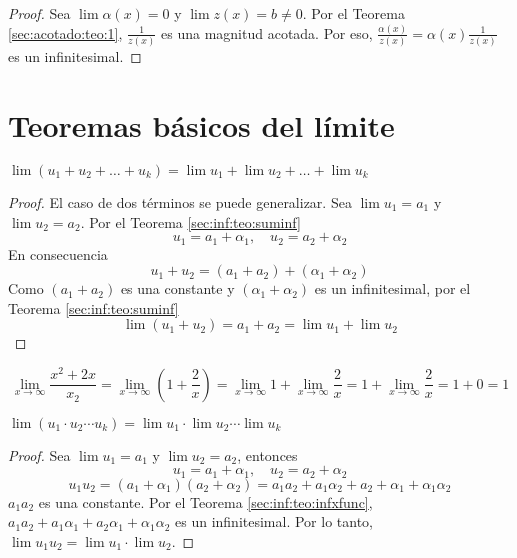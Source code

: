 \begin{proof}
  Sea $\lim \alpha(x) = 0$ y $\lim z(x) = b \ne 0$. Por el Teorema \ref{sec:acotado:teo:1}, $\frac {1} {z(x)}$ es una magnitud acotada. Por eso, $\frac {\alpha(x)} {z(x)} = \alpha(x) \frac{1}{z(x)}$ es un infinitesimal.
\end{proof}




\section{Teoremas básicos del límite}


\begin{theorem}
  $\lim (u_1 + u_2 + \dots + u_k) = \lim u_1 + \lim u_2 + \dots + \lim u_k $
\end{theorem}

\begin{proof}
  El caso de dos términos se puede generalizar. Sea $\lim u_1 = a_1$ y $\lim u_2 = a_2$. Por el Teorema \ref{sec:inf:teo:suminf}
  $$u_1 = a_1 + \alpha_1, \quad u_2 = a_2 + \alpha_2$$
  En consecuencia
  $$u_1 + u_2 = (a_1 + a_2) + (\alpha_1 + \alpha_2)$$
  Como $(a_1 + a_2)$ es una constante y $(\alpha_1 + \alpha_2)$ es un infinitesimal, por el Teorema \ref{sec:inf:teo:suminf}
  $$\lim (u_1 + u_2) = a_1 + a_2 = \lim u_1 + \lim u_2$$
\end{proof}


\begin{example}
  $$\lim_{x \to \infty} \frac {x^2 + 2x} {x_2} = \lim_{x \to \infty} (1 + \frac{2}{x}) = \lim_{x \to \infty} 1 + \lim_{x \to \infty} \frac{2}{x} = 1 + \lim_{x \to \infty} \frac{2}{x} = 1 + 0 = 1$$
\end{example}


\begin{theorem}
  $\lim (u_1 \cdot u_2 \cdots u_k) = \lim u_1 \cdot \lim u_2 \cdots \lim u_k $
\end{theorem}

\begin{proof}
  Sea $\lim u_1 = a_1$ y $\lim u_2 = a_2$, entonces
  $$u_1 = a_1 + \alpha_1, \quad u_2 = a_2 + \alpha_2$$
  $$u_1 u_2 = (a_1 + \alpha_1) (a_2 + \alpha_2) = a_1 a_2 + a_1 \alpha_2 + a_2 + \alpha_1 + \alpha_1 \alpha_2$$
  $a_1 a_2$ es una constante. Por el Teorema \ref{sec:inf:teo:infxfunc}, $a_1 a_2 + a_1 \alpha_1 + a_2 \alpha_1 + \alpha_1 \alpha_2$  es un infinitesimal. Por lo tanto, $\lim u_1 u_2 = \lim u_1 \cdot \lim u_2$.
\end{proof}


